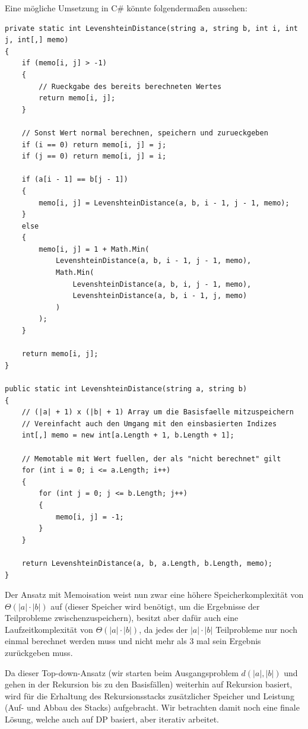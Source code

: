\documentclass{whswinvcbook}
\begin{document}
Eine mögliche Umsetzung in C\# könnte folgendermaßen aussehen:
\begin{lstlisting}[caption=Levenshtein-Distanz mit Memoisation, label=lst:levenshtein_memoization]
private static int LevenshteinDistance(string a, string b, int i, int j, int[,] memo)
{
    if (memo[i, j] > -1)
    {
        // Rueckgabe des bereits berechneten Wertes
        return memo[i, j];
    }

    // Sonst Wert normal berechnen, speichern und zurueckgeben
    if (i == 0) return memo[i, j] = j;
    if (j == 0) return memo[i, j] = i;

    if (a[i - 1] == b[j - 1])
    {
        memo[i, j] = LevenshteinDistance(a, b, i - 1, j - 1, memo);
    }
    else
    {
        memo[i, j] = 1 + Math.Min(
            LevenshteinDistance(a, b, i - 1, j - 1, memo),
            Math.Min(
                LevenshteinDistance(a, b, i, j - 1, memo),
                LevenshteinDistance(a, b, i - 1, j, memo)
            )
        );
    }

    return memo[i, j];
}

public static int LevenshteinDistance(string a, string b)
{
    // (|a| + 1) x (|b| + 1) Array um die Basisfaelle mitzuspeichern
    // Vereinfacht auch den Umgang mit den einsbasierten Indizes
    int[,] memo = new int[a.Length + 1, b.Length + 1];

    // Memotable mit Wert fuellen, der als "nicht berechnet" gilt
    for (int i = 0; i <= a.Length; i++)
    {
        for (int j = 0; j <= b.Length; j++)
        {
            memo[i, j] = -1;
        }
    }

    return LevenshteinDistance(a, b, a.Length, b.Length, memo);
}
\end{lstlisting}
Der Ansatz mit Memoisation weist nun zwar eine höhere Speicherkomplexität von $\Theta(|a|\cdot|b|)$ auf (dieser Speicher wird benötigt, um die Ergebnisse der Teilprobleme zwischenzuspeichern), besitzt aber dafür auch eine Laufzeitkomplexität von $\Theta(|a|\cdot|b|)$, da jedes der $|a|\cdot|b|$ Teilprobleme nur noch einmal berechnet werden muss und nicht mehr als $3$ mal sein Ergebnis zurückgeben muss.

Da dieser Top-down-Ansatz (wir starten beim Ausgangsproblem $d(|a|,|b|)$ und gehen in der Rekursion bis zu den Basisfällen) weiterhin auf Rekursion basiert, wird für die Erhaltung des Rekursionsstacks zusätzlicher Speicher und Leistung (Auf- und Abbau des Stacks) aufgebracht. Wir betrachten damit noch eine finale Lösung, welche auch auf DP basiert, aber iterativ arbeitet.
\end{document}
